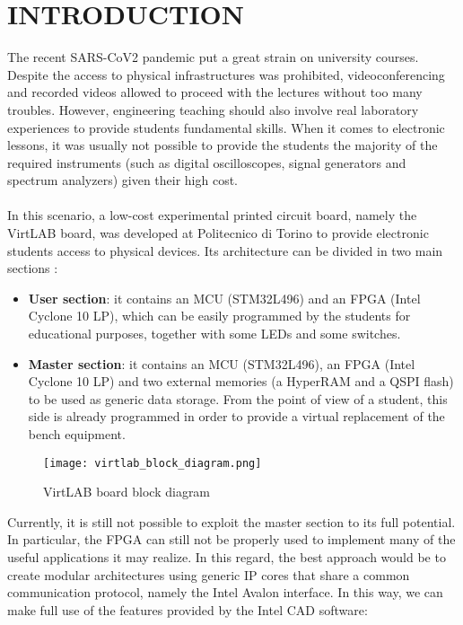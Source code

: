 \documentclass[10pt, english, a4paper, titlepage, oneside]{book}
\begin{document}
\chapter{INTRODUCTION}
\noindent The recent SARS-CoV2 pandemic put a great strain on university courses. Despite the access to physical infrastructures was prohibited, videoconferencing and recorded videos allowed to proceed with the lectures without too many troubles. However, engineering teaching should also involve real laboratory experiences to provide students fundamental skills. When it comes to electronic lessons, it was usually not possible to provide the students the majority of the required instruments (such as digital oscilloscopes, signal generators and spectrum analyzers) given their high cost.  \\ \\ 
In this scenario, a low-cost experimental printed circuit board, namely the VirtLAB board, was developed at Politecnico di Torino to provide electronic students access to physical devices. Its architecture can be divided in two main sections \cite{virtlab}:
\vspace{2mm}
\begin{itemize}
    \item \textbf{User section}: it contains an \acrshort{MCU} (STM32L496) and an \acrshort{FPGA} (Intel Cyclone 10 LP), which can be easily programmed by the students for educational purposes, together with some LEDs and some switches.
    \vspace{1mm}
    \item \textbf{Master section}: it contains an MCU (STM32L496), an FPGA (Intel Cyclone 10 LP) and two external memories (a Hyper\acrshort{RAM} and a QSPI flash) to be used as generic data storage. From the point of view of a student, this side is already programmed in order to provide a virtual replacement of the bench equipment.
\end{itemize} 
\vspace{3mm}
\begin{figure}[H]
    \centering
    \texttt{[image: virtlab\_block\_diagram.png]}
    \vspace{5mm}
    \caption{VirtLAB board block diagram}
    \label{virtlab_block_diagram}
\end{figure}
\vspace{5mm}
Currently, it is still not possible to exploit the master section to its full potential. In particular, the FPGA can still not be properly used to implement many of the useful applications it may realize. In this regard, the best approach would be to create modular architectures using generic \acrshort{IP} cores that share a common communication protocol, namely the Intel Avalon interface. In this way, we can make full use of the features provided by the Intel CAD software:
\end{document}
